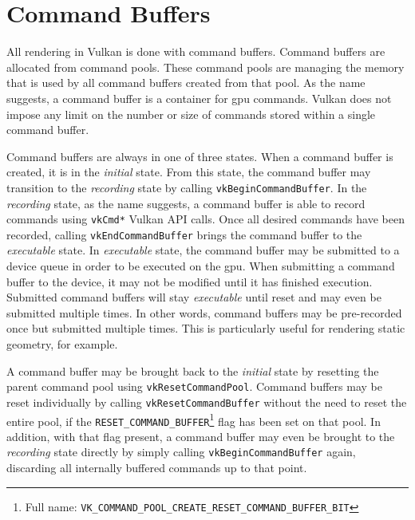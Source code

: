   \section{Command Buffers}
  \label{sec:CommandBuffers}
    All rendering in Vulkan is done with command buffers.
    Command buffers are allocated from command pools.
    These command pools are managing the memory that is used by all command buffers created from that pool.
    As the name suggests, a command buffer is a container for \gls{gpu} commands.
    Vulkan does not impose any limit on the number or size of commands stored within a single command buffer.

    Command buffers are always in one of three states.
    When a command buffer is created, it is in the \textit{initial} state.
    From this state, the command buffer may transition to the \textit{recording} state by calling \lstinline{vkBeginCommandBuffer}.
    In the \textit{recording} state, as the name suggests, a command buffer is able to record commands using \lstinline{vkCmd*} Vulkan API calls.
    Once all desired commands have been recorded, calling \lstinline{vkEndCommandBuffer} brings the command buffer to the \textit{executable} state.
    In \textit{executable} state, the command buffer may be submitted to a device queue in order to be executed on the \gls{gpu}.
    When submitting a command buffer to the device, it may not be modified until it has finished execution.
    Submitted command buffers will stay \textit{executable} until reset and may even be submitted multiple times.
    In other words, command buffers may be pre-recorded once but submitted multiple times.
    This is particularly useful for rendering static geometry, for example.

    A command buffer may be brought back to the \textit{initial} state by resetting the parent command pool using \lstinline{vkResetCommandPool}.
    Command buffers may be reset individually by calling \lstinline{vkResetCommandBuffer} without the need to reset the entire pool, if the \lstinline{RESET_COMMAND_BUFFER}\footnote{Full name: \lstinline{VK_COMMAND_POOL_CREATE_RESET_COMMAND_BUFFER_BIT}} flag has been set on that pool.
    In addition, with that flag present, a command buffer may even be brought to the \textit{recording} state directly by simply calling \lstinline{vkBeginCommandBuffer} again, discarding all internally buffered commands up to that point.

